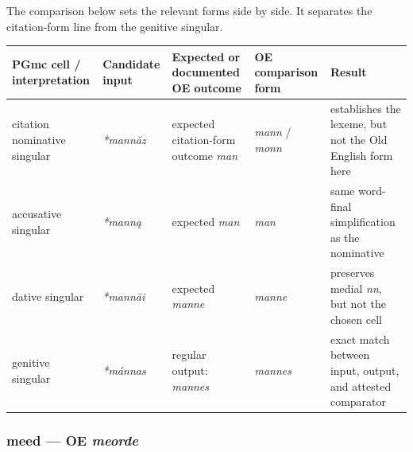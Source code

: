 \documentclass[
  british,
  a4paper,
]{article}
\newcounter{none} %
\begin{document}
The comparison below sets the relevant forms side by side. It separates
the citation-form line from the genitive singular.

{\def\LTcaptype{none} %
\begin{longtable}[]{@{}
  >{\raggedright\arraybackslash}p{}
  >{\raggedright\arraybackslash}p{}
  >{\raggedright\arraybackslash}p{}
  >{\raggedright\arraybackslash}p{}
  >{\raggedright\arraybackslash}p{}@{}}
\toprule\noalign{}
\begin{minipage}[b]{\linewidth}\raggedright
PGmc cell / interpretation
\end{minipage} & \begin{minipage}[b]{\linewidth}\raggedright
Candidate input
\end{minipage} & \begin{minipage}[b]{\linewidth}\raggedright
Expected or documented OE outcome
\end{minipage} & \begin{minipage}[b]{\linewidth}\raggedright
OE comparison form
\end{minipage} & \begin{minipage}[b]{\linewidth}\raggedright
Result
\end{minipage} \\
\midrule\noalign{}
\endhead
\bottomrule\noalign{}
\endlastfoot
citation nominative singular & {\emph{*mannăz}} & expected citation-form
outcome {\emph{man}} & {\emph{mann}} / {\emph{monn}} & establishes the
lexeme, but not the Old English form here \\
accusative singular & {\emph{*manną}} & expected {\emph{man}} &
{\emph{man}} & same word-final simplification as the nominative \\
dative singular & {\emph{*mannăi}} & expected {\emph{manne}} &
{\emph{manne}} & preserves medial \emph{nn}, but not the chosen cell \\
genitive singular & {\emph{*mánnas}} & regular output: {\emph{mannes}} &
{\emph{mannes}} & exact match between input, output, and attested
comparator \\
\end{longtable}
}

\subsubsection{\texorpdfstring{meed --- OE
\emph{meorde}}{meed --- OE meorde}}\label{meed-oe-meorde}
\end{document}
